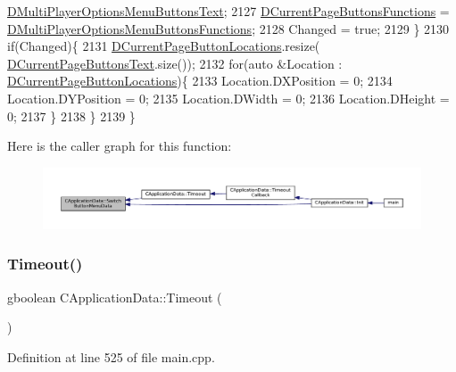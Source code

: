 \begin{DoxyCode}
      \hyperlink{classCApplicationData_a400aa1df18482fe5d9f34e861a0dc257}{DMultiPlayerOptionsMenuButtonsText};
2127         \hyperlink{classCApplicationData_ad3079e5563a19d21c1e4ceff2a188382}{DCurrentPageButtonsFunctions} = 
      \hyperlink{classCApplicationData_ad32d3cc90fd1ead1574cb6c336257e1c}{DMultiPlayerOptionsMenuButtonsFunctions};
2128         Changed = \textcolor{keyword}{true};
2129     \}
2130     \textcolor{keywordflow}{if}(Changed)\{
2131         \hyperlink{classCApplicationData_a3615df8e23cea3ce17f11cf61340a7b4}{DCurrentPageButtonLocations}.resize(
      \hyperlink{classCApplicationData_af04b7f5f8ba4e5c99c0a3530055fc15d}{DCurrentPageButtonsText}.size());
2132         \textcolor{keywordflow}{for}(\textcolor{keyword}{auto} &Location : \hyperlink{classCApplicationData_a3615df8e23cea3ce17f11cf61340a7b4}{DCurrentPageButtonLocations})\{
2133             Location.DXPosition = 0;
2134             Location.DYPosition = 0;
2135             Location.DWidth = 0;
2136             Location.DHeight = 0;
2137         \}
2138     \}
2139 \}
\end{DoxyCode}
Here is the caller graph for this function\+:\nopagebreak
\begin{figure}[H]
\begin{center}
\leavevmode
\includegraphics[width=350pt]{classCApplicationData_a2a464fd480c791ab13a1b1ca855e4578_icgraph}
\end{center}
\end{figure}
\hypertarget{classCApplicationData_aae0775b38fac01308e8a81b64db49500}{}\label{classCApplicationData_aae0775b38fac01308e8a81b64db49500} 
\subsubsection{\texorpdfstring{Timeout()}{Timeout()}}
{\footnotesize\ttfamily gboolean C\+Application\+Data\+::\+Timeout (\begin{DoxyParamCaption}{ }\end{DoxyParamCaption})\hspace{0.3cm}{\ttfamily [protected]}}



Definition at line 525 of file main.\+cpp.


